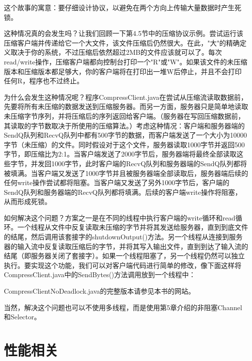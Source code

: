 	这个故事的寓意：要仔细设计协议，以避免在两个方向上传输大量数据时产生死锁。

	这种情况真的会发生吗？让我们回顾一下第4.5节中的压缩协议示例。尝试运行该压缩客户端并传递给它一个大文件，该文件压缩后仍然很大。在此，"大"的精确定义取决于你的系统，不过压缩后依然超过2MB的文件应该就可以了。每次read/write操作，压缩客户端都向控制台打印一个"R"或"W"。如果该文件的未压缩版本和压缩版本都足够大，你的客户端将在打印出一堆W后停止，并且不会打印任何R，程序也不过终止。

	为什么会发生这种情况呢？程序CompressClient.java在尝试从压缩流读取数据前，先要将所有未压缩的数据发送到压缩服务器。而另一方面，服务器只是简单地读取未压缩字节序列，并将压缩后的序列返回给客户端。（服务器在写回压缩数据前，其读取的字节数取决于所使用的压缩算法。）考虑这种情况：客户端和服务器端的SendQ队列和RecvQ队列中都有500字节的数据，而客户端发送了一个大小为10000字节（未压缩）的文件。同时假设对于这个文件，服务器读取1000字节并返回500字节，即压缩比为2:1。当客户端发送了2000字节后，服务器端将最终全部读取这些字节，并发回1000字节，此时客户端的RecvQ队列和服务器端的SendQ队列都将被填满。当客户端又发送了1000字节并且被服务器端全部读取后，服务器端后续的任何write操作尝试都将阻塞。当客户端又发送了另外1000字节后，客户端的SendQ队列和服务器端的RecvQ队列都将填满。后续的客户端write操作将阻塞，从而形成死锁。

	

	如何解决这个问题？方案之一是在不同的线程中执行客户端的write循环和read循环。一个线程从文件中反复读取未压缩的字节并将其发送给服务器，直到到底文件的结尾，然后调用该套接字的shutdownOutput()方法。另一个线程从连接到服务器的输入流中反复读取压缩后的字节，并将其写入输出文件，直到到达了输入流的结尾（即服务器关闭了套接字）。如果一个线程阻塞了，另一个线程仍然可以独立执行。要实现这个功能，我们可以对客户端代码进行简单的修改，像下面这样将CompressClient.java中的SendBytes()方法调用放到一个线程中：

	

	CompressClientNoDeadlock.java的完整版本请参见本书的网站。

	

	当然，解决这个问题也可以不使用多线程，而是使用第5章介绍的非阻塞Channel和Selector。

\section{性能相关}

